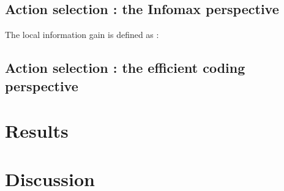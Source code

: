 \documentclass[12pt,twoside,openright]{article}
\begin{document}
\subsection{Action selection : the Infomax perspective}

The local information gain is defined as :


\subsection{Action selection : the efficient coding perspective}

\section{Results}

\section{Discussion}



\end{document}
